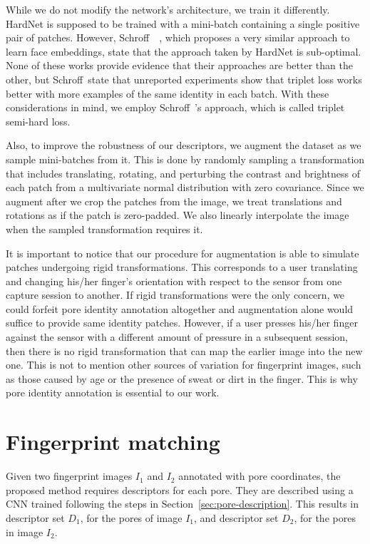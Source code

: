 \documentclass[10pt,twocolumn,letterpaper]{article}
\begin{document}
While we do not modify the network's architecture, we train it differently.
HardNet is supposed to be trained with a mini-batch containing a single positive pair of patches.
However, Schroff~\etal~\cite{facenet}, which proposes a very similar approach to learn face embeddings, state that the approach taken by HardNet is sub-optimal.
None of these works provide evidence that their approaches are better than the other, but Schroff~\etal state that unreported experiments show that triplet loss works better with more examples of the same identity in each batch.
With these considerations in mind, we employ Schroff~\etal's approach, which is called triplet semi-hard loss.

Also, to improve the robustness of our descriptors, we augment the dataset as we sample mini-batches from it.
This is done by randomly sampling a transformation that includes translating, rotating, and perturbing the contrast and brightness of each patch from a multivariate normal distribution with zero covariance.
Since we augment after we crop the patches from the image, we treat translations and rotations as if the patch is zero-padded.
We also linearly interpolate the image when the sampled transformation requires it.

It is important to notice that our procedure for augmentation is able to simulate patches undergoing rigid transformations.
This corresponds to a user translating and changing his/her finger's orientation with respect to the sensor from one capture session to another.
If rigid transformations were the only concern, we could forfeit pore identity annotation altogether and augmentation alone would suffice to provide same identity patches.
However, if a user presses his/her finger against the sensor with a different amount of pressure in a subsequent session, then there is no rigid transformation that can map the earlier image into the new one.
This is not to mention other sources of variation for fingerprint images, such as those caused by age or the presence of sweat or dirt in the finger. %
This is why pore identity annotation is essential to our work.

\section{Fingerprint matching}
\label{sec:rec}
Given two fingerprint images $I_1$ and $I_2$ annotated with pore coordinates, the proposed method requires descriptors for each pore.
They are described using a CNN trained following the steps in Section~\ref{sec:pore-description}.
This results in descriptor set $D_1$, for the pores of image $I_1$, and descriptor set $D_2$, for the pores in image $I_2$.
\end{document}
